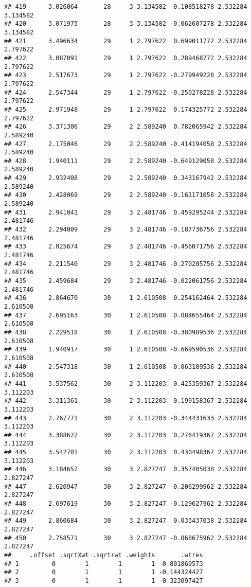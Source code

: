 \documentclass[]{book}
\theoremstyle{definition}
\theoremstyle{definition}
\theoremstyle{definition}
\theoremstyle{remark}
\begin{document}
\begin{verbatim}
## 419      3.026064       28     3 3.134582 -0.108518278 2.532284 3.134582
## 420      3.071975       28     3 3.134582 -0.062607278 2.532284 3.134582
## 421      3.496634       29     1 2.797622  0.699011772 2.532284 2.797622
## 422      3.087091       29     1 2.797622  0.289468772 2.532284 2.797622
## 423      2.517673       29     1 2.797622 -0.279949228 2.532284 2.797622
## 424      2.547344       29     1 2.797622 -0.250278228 2.532284 2.797622
## 425      2.971948       29     1 2.797622  0.174325772 2.532284 2.797622
## 426      3.371306       29     2 2.589240  0.782065942 2.532284 2.589240
## 427      2.175046       29     2 2.589240 -0.414194058 2.532284 2.589240
## 428      1.940111       29     2 2.589240 -0.649129058 2.532284 2.589240
## 429      2.932408       29     2 2.589240  0.343167942 2.532284 2.589240
## 430      2.428069       29     2 2.589240 -0.161171058 2.532284 2.589240
## 431      2.941041       29     3 2.481746  0.459295244 2.532284 2.481746
## 432      2.294009       29     3 2.481746 -0.187736756 2.532284 2.481746
## 433      2.025674       29     3 2.481746 -0.456071756 2.532284 2.481746
## 434      2.211540       29     3 2.481746 -0.270205756 2.532284 2.481746
## 435      2.459684       29     3 2.481746 -0.022061756 2.532284 2.481746
## 436      2.864670       30     1 2.610508  0.254162464 2.532284 2.610508
## 437      2.695163       30     1 2.610508  0.084655464 2.532284 2.610508
## 438      2.229518       30     1 2.610508 -0.380989536 2.532284 2.610508
## 439      1.940917       30     1 2.610508 -0.669590536 2.532284 2.610508
## 440      2.547318       30     1 2.610508 -0.063189536 2.532284 2.610508
## 441      3.537562       30     2 3.112203  0.425359367 2.532284 3.112203
## 442      3.311361       30     2 3.112203  0.199158367 2.532284 3.112203
## 443      2.767771       30     2 3.112203 -0.344431633 2.532284 3.112203
## 444      3.388622       30     2 3.112203  0.276419367 2.532284 3.112203
## 445      3.542701       30     2 3.112203  0.430498367 2.532284 3.112203
## 446      3.184652       30     3 2.827247  0.357405038 2.532284 2.827247
## 447      2.620947       30     3 2.827247 -0.206299962 2.532284 2.827247
## 448      2.697619       30     3 2.827247 -0.129627962 2.532284 2.827247
## 449      2.860684       30     3 2.827247  0.033437038 2.532284 2.827247
## 450      2.758571       30     3 2.827247 -0.068675962 2.532284 2.827247
##     .offset .sqrtXwt .sqrtrwt .weights       .wtres
## 1         0        1        1        1  0.801869573
## 2         0        1        1        1 -0.144324427
## 3         0        1        1        1 -0.323097427

\end{verbatim}
\end{document}
